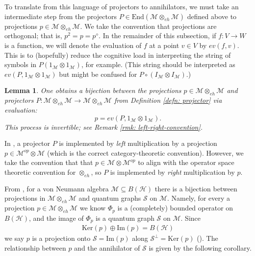 \documentclass[12pt]{article}
\newtheorem{lemma}[theorem]{Lemma}
\theoremstyle{definition}
\newenvironment{remark}
  {\pushQED{\qed}\renewcommand{\qedsymbol}{\textcircled{\tiny R}}\remarkx}
  {\popQED\endremarkx}
\newcommand{\mc}[1]{\mathcal{#1}}
\newcommand{\<}{\langle}
\renewcommand{\>}{\rangle}
\renewcommand{\subset}{\subseteq}
\newcommand{\eh}{\otimes_{eh}}
\begin{document}
To translate from this language of projectors to annihilators, we must take an intermediate step from the projectors $P\in \text{End}(\mc M \eh \mc M)$ defined above to projections $p \in \mc M \eh \mc M$. We take the convention that projections are orthogonal; that is, $p^2 = p = p^\diamond$. In the remainder of this subsection, if $f: V \to W$ is a function, we will denote the evaluation of $f$ at a point $v \in V$ by $ev(f,v)$. This is to (hopefully) reduce the cognitive load in interpreting the string of symbols in $P(1_{\mc M} \otimes 1_{\mc M})$, for example. (This string should be interpreted as $ev(P, 1_{\mc M} \otimes 1_{\mc M})$ but might be confused for $P \circ (I_{\mc M} \otimes I_{\mc M})$.)

\begin{lemma}  \label{lem: proj-proj}
    One obtains a bijection between the projections $p \in \mc M \eh \mc M$ and projectors $P: \mc M \eh \mc M \to \mc M \eh \mc M$ from Definition \ref{defn: projector} via evaluation:
    \[
    p = ev(P,1_{\mc M} \otimes 1_{\mc M}).
    \]
    This process is invertible; see Remark \ref{rmk: left-right-convention}.
\end{lemma}

\begin{remark} \label{rmk: left-right-convention}
In \cite[Remark 7.3]{musto-reutter-verdon}, a projector $P$ is implemented by \textit{left} multiplication by a projection $p \in \mc M^{op} \otimes \mc M$ (which is the correct category-theoretic convention). However, we take the convention that that $p \in \mc M \otimes \mc M^{op}$ to align with the operator space theoretic convention for $\otimes_{eh}$, so $P$ is implemented by \textit{right} multiplication by $p$. 
\end{remark}

From \cite[Corollary 5.13]{daws}, for a von Neumann algebra $\mc M \subset B(\mc H)$ there is a bijection between projections in $\mc M \eh \mc M$ and quantum graphs $\mc S$ on $\mc M$. Namely, for every a projection $p \in \mc M \eh \mc M$ we know $\Phi_p$ is a (completely) bounded operator on $B(\mc H)$, and the image of $\Phi_p$ is a quantum graph $\mc S$ on $\mc M$. Since
\begin{align*}
    \text{Ker}(p) \oplus \text{Im}(p) = B(\mc H) 
\end{align*}
we say $p$ is a projection onto $\mc S = \text{Im}(p)$ along $\mc S^\perp = \text{Ker}(p)$ (\cite[Definition 5.11]{daws}). The relationship between $p$ and the annihilator of $\mc S$ is given by the following corollary.
\end{document}
